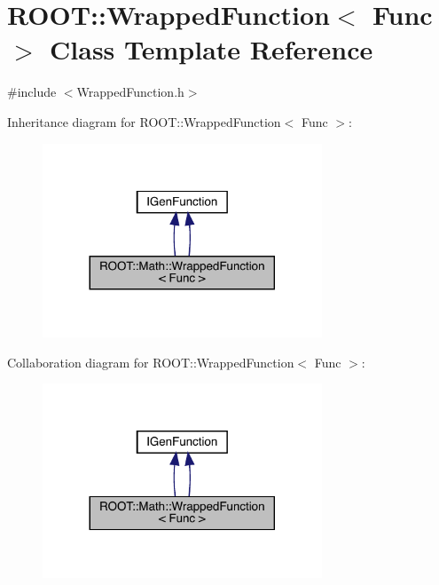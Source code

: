 \hypertarget{classROOT_1_1Math_1_1WrappedFunction}{}\section{R\+O\+OT\+:\+:Wrapped\+Function$<$ Func $>$ Class Template Reference}
\label{classROOT_1_1Math_1_1WrappedFunction}


{\ttfamily \#include $<$Wrapped\+Function.\+h$>$}



Inheritance diagram for R\+O\+OT\+:\+:Wrapped\+Function$<$ Func $>$\+:\nopagebreak
\begin{figure}[H]
\begin{center}
\leavevmode
\includegraphics[width=236pt]{d3/d1e/classROOT_1_1Math_1_1WrappedFunction__inherit__graph}
\end{center}
\end{figure}


Collaboration diagram for R\+O\+OT\+:\+:Wrapped\+Function$<$ Func $>$\+:\nopagebreak
\begin{figure}[H]
\begin{center}
\leavevmode
\includegraphics[width=236pt]{d2/d6d/classROOT_1_1Math_1_1WrappedFunction__coll__graph}
\end{center}
\end{figure}
